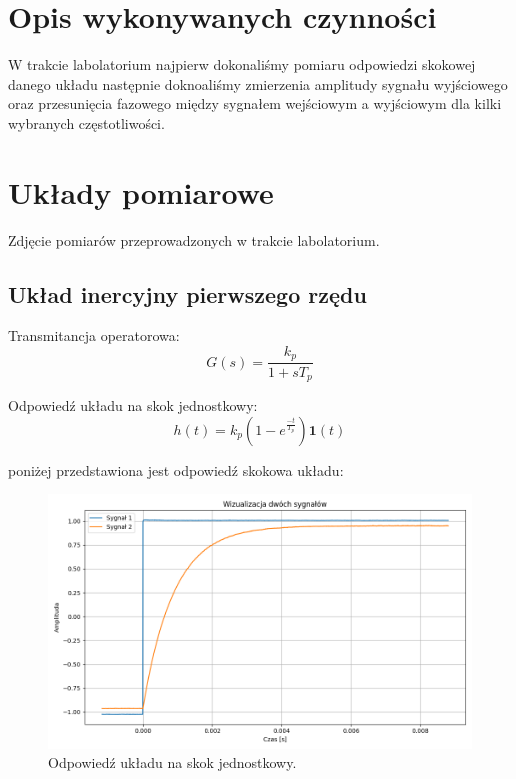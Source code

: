\documentclass[12pt,a4paper]{article}
\begin{document}
	\section{Opis wykonywanych czynności}
	W trakcie labolatorium najpierw dokonaliśmy pomiaru odpowiedzi skokowej danego 
	układu następnie doknoaliśmy zmierzenia amplitudy sygnału wyjściowego oraz przesunięcia fazowego między sygnałem wejściowym a wyjściowym dla kilki wybranych częstotliwości.
	
	
	\section{Układy pomiarowe}
	
 	\quad Zdjęcie pomiarów przeprowadzonych w trakcie labolatorium.
	
	\subsection{Układ inercyjny pierwszego rzędu}
		Transmitancja operatorowa:
		\begin{equation}
			G(s) = \frac{k_p}{1 + sT_p}
		\end{equation}
	
	\noindent Odpowiedź układu na skok jednostkowy:
		\begin{equation}
			h(t) = k_p(1-e^{\frac{-t}{T_p}})\mathbf{1}(t)
		\end{equation}
		
	\noindent	poniżej przedstawiona jest odpowiedź skokowa układu:
		\begin{figure}[H]
			\centering
			\includegraphics[width=1\textwidth]{zdjecia/Figure_1.png}
			\caption{Odpowiedź układu na skok jednostkowy.}
			\label{fig:odp_na_skok_uk1rz}
		\end{figure}
		
\end{document}

